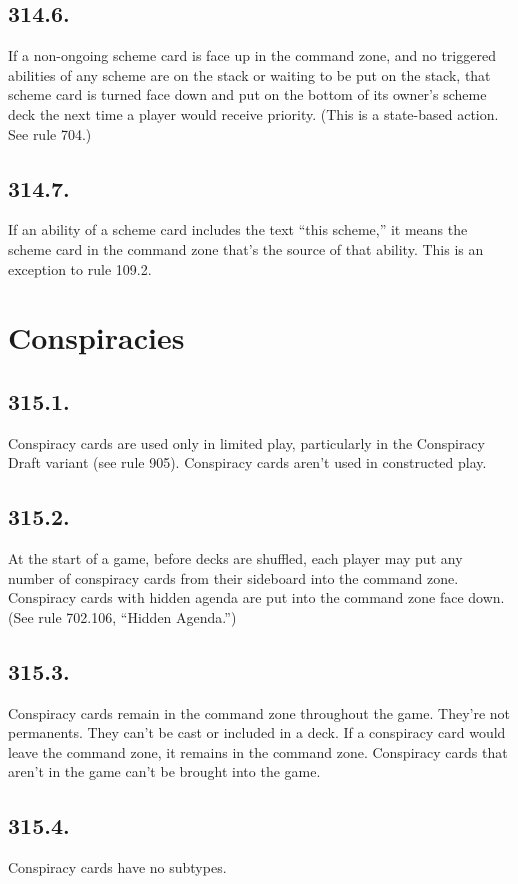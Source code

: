\subsection*{314.6.}
If a non-ongoing scheme card is face up in the command zone, and no triggered abilities of any scheme are on the stack or waiting to be put on the stack, that scheme card is turned face down and put on the bottom of its owner’s scheme deck the next time a player would receive priority. (This is a state-based action. See rule 704.)

\subsection*{314.7.}
If an ability of a scheme card includes the text “this scheme,” it means the scheme card in the command zone that’s the source of that ability. This is an exception to rule 109.2.

\section{Conspiracies}
\subsection*{315.1.}
Conspiracy cards are used only in limited play, particularly in the Conspiracy Draft variant (see rule 905). Conspiracy cards aren’t used in constructed play.

\subsection*{315.2.}
At the start of a game, before decks are shuffled, each player may put any number of conspiracy cards from their sideboard into the command zone. Conspiracy cards with hidden agenda are put into the command zone face down. (See rule 702.106, “Hidden Agenda.”)

\subsection*{315.3.}
Conspiracy cards remain in the command zone throughout the game. They’re not permanents. They can’t be cast or included in a deck. If a conspiracy card would leave the command zone, it remains in the command zone. Conspiracy cards that aren’t in the game can’t be brought into the game.

\subsection*{315.4.}
Conspiracy cards have no subtypes.

